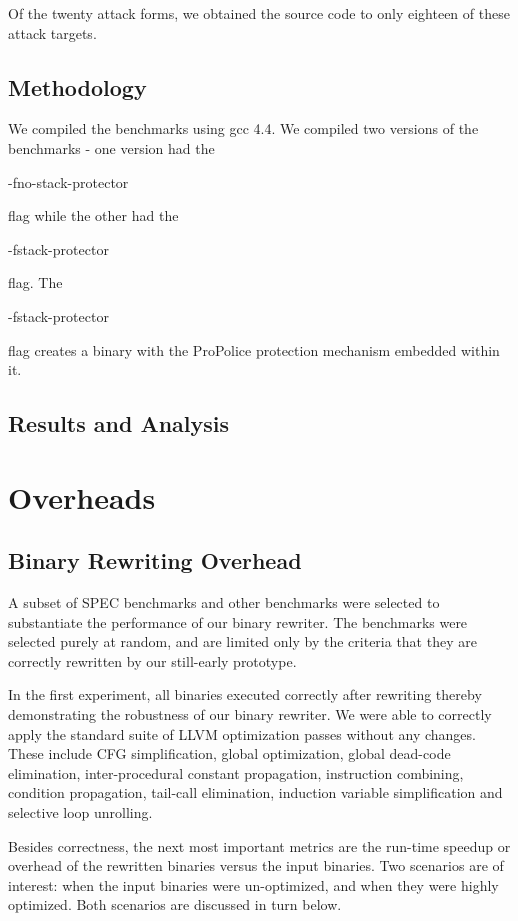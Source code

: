 Of the twenty attack forms, we obtained the source code to only eighteen of these attack targets.

\subsection{Methodology}

We compiled the benchmarks using gcc 4.4. We compiled two versions of the benchmarks - one version
had the \begin{em}-fno-stack-protector\end{em} flag while the other had the
\begin{em}-fstack-protector\end{em} flag. The \begin{em}-fstack-protector\end{em} flag creates a
binary with the ProPolice protection mechanism embedded within it.

\subsection{Results and Analysis}

\section{Overheads}

\subsection{Binary Rewriting Overhead}

A subset of SPEC benchmarks and other benchmarks were selected to substantiate the performance of
our binary rewriter. The benchmarks were selected purely at random, and are limited only by the
criteria that they are correctly rewritten by our still-early prototype.

In the first experiment, all binaries executed correctly after rewriting thereby demonstrating the
robustness of our binary rewriter. We were able to correctly apply the standard suite of LLVM
optimization passes without any changes. These include CFG simplification, global optimization,
global dead-code elimination, inter-procedural constant propagation, instruction combining,
condition propagation, tail-call elimination, induction variable simplification and selective loop
unrolling.

Besides correctness, the next most important metrics are the run-time speedup or overhead of the
rewritten binaries versus the input binaries. Two scenarios are of interest: when the input binaries
were un-optimized, and when they were highly optimized. Both scenarios are discussed in turn below.

